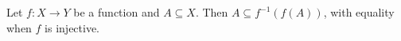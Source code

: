 Let $f : X \to Y$ be a function and $A \subseteq X$.
Then $A \subseteq f^{-1}(f(A))$, with equality when $f$ is injective.